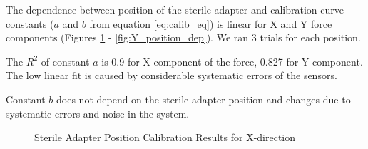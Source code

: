 The dependence between position of the sterile adapter and calibration curve constants ($a$ and $b$ from equation \ref{eq:calib_eq}) is linear for X and Y force components (Figures \ref{fig:X_position_dep} - \ref{fig:Y_position_dep}). We ran 3 trials for each position.

The $R^2$ of constant $a$ is 0.9 for X-component of the force, 0.827 for Y-component. The low linear fit is caused by considerable systematic errors of the sensors.

Constant $b$ does not depend on the sterile adapter position and changes due to systematic errors and noise in the system.

	
\begin{figure}[h]%
\centering
{}%
\qquad
{}%
\caption{Sterile Adapter Position Calibration Results for X-direction}
\label{fig:X_position_dep}%
\end{figure}


